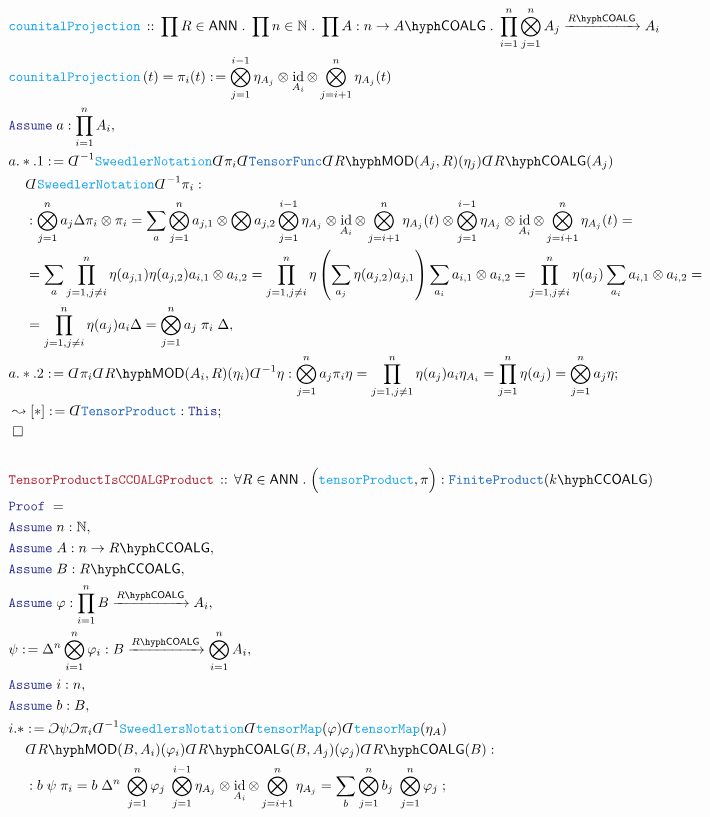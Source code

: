 \documentclass[12pt]{scrartcl}%
\newcommand{\TYPE}[1]{\textcolor{NavyBlue}{\mathtt{#1}}}%
\newcommand{\FUNC}[1]{\textcolor{Cerulean}{\mathtt{#1}}}%
\newcommand{\LOGIC}[1]{\textcolor{Blue}{\mathtt{#1}}}%
\newcommand{\THM}[1]{\textcolor{Maroon}{\mathtt{#1}}}%
\renewcommand{\.}{\; . \;} %
\newcommand{\de}{: \kern 0.1pc =} %
\newcommand{\Act}[1]{\left( #1 \right)} %
\newcommand{\Theorem}[2]{& \THM{#1} \, :: \, #2 \\ & \Proof = \\ } %
\newcommand{\DeclareFunc}[2]{& \FUNC{#1} \, :: \, #2 \\}%
\newcommand{\DefineNamedFunc}[4]{&  \FUNC{#1}\Act{#2} = #3 \de #4 \\}%
\newcommand{\NewLine}{\\ & \kern 1pc}%
\newcommand{\Page}[1]{ \begin{align*} #1 \end{align*}  }%
\newcommand{ \bd }{ \ByDef }%
\newcommand{\Nat}{\mathbb{N}}%
\DeclareMathOperator*{\id}{id}%
\newcommand{\Say}[3]{& #1 \de #2 : #3, \\} %
\newcommand{\Conclude}[3]{& #1 \de #2 : #3; \\}%
\newcommand{\DeriveConclude}[3]{& \leadsto #1 \de #2 : #3 ; \\} %
\newcommand{\Assume}[2]{& \LOGIC{Assume} \; #1 : #2, \\} %
\newcommand{\QED}{\; \square} %
\newcommand{\EndProof}{& \QED \\} %
\newcommand{\ByDef}{\rotatebox[origin=c]{-180}{$D$}}%
\newcommand{\ByConstr}{\rotatebox[origin=c]{-180}{$C$}}%
\newcommand{\Proof}{\LOGIC{Proof} \; } %
\newcommand{\Arrow}[1]{\xrightarrow{#1}}%
\newcommand{\LMOD}[1]{#1\hyph\mathsf{MOD}} %
\newcommand{\ANN}{\mathsf{ANN}} %
\newcommand{\COALG}[1]{#1\hyph\mathsf{COALG}}%
\newcommand{\CCOALG}[1]{#1\hyph\mathsf{CCOALG}}%
\begin{document}
\Page{
	\DeclareFunc{counitalProjection}{
		\prod R \in \ANN \. 
		\prod n \in \Nat \. 
		\prod A : n \to \COALG{A} \. 
		\prod^n_{i=1} \bigotimes^n_{j=1} A_j \Arrow{\COALG{R}} A_i }
	\DefineNamedFunc{counitalProjection}
	{
		t
	}
	{
		\pi_i(t)
	}
	{
		\bigotimes_{j=1}^{i-1} \eta_{A_j} \otimes \id_{A_i} \otimes \bigotimes_{j=i+1}^n \eta_{A_j} (t)
	}
	\Assume{a}{\prod^n_{i=1} A_i}
	\Say{a.*.1}{
		\bd^{-1} \FUNC{SweedlerNotation} \bd \pi_i \bd 
		\TYPE{TensorFunc} 
		\bd \LMOD{R}(A_j,R)(\eta_j)
		\bd \COALG{R}(A_j)
		\NewLine 
		\bd \FUNC{SweedlerNotation} 
		\bd^{-1} \pi_i
	} 
	{
		\NewLine : 
		\bigotimes^n_{j=1} a_j \Delta \pi_i \otimes \pi_i =
		\sum_a \bigotimes^n_{j=1} a_{j,1} \otimes \bigotimes a_{j,2}
		\bigotimes_{j=1}^{i-1} \eta_{A_j} \otimes \id_{A_i} \otimes \bigotimes_{j=i+1}^n \eta_{A_j} (t)
		\otimes
		\bigotimes_{j=1}^{i-1} \eta_{A_j} \otimes \id_{A_i} \otimes \bigotimes_{j=i+1}^n \eta_{A_j} (t) = \NewLine = 
		\sum_a    \prod^n_{j=1,j\neq i} \eta(a_{j,1}) \eta(a_{j,2})  a_{i,1} \otimes a_{i,2} =
		\prod^n_{j=1,j \neq i} \eta\left( \sum_{a_{j}} \eta (a_{j,2})  a_{j,1} \right) \sum_{a_i} a_{i,1} \otimes a_{i,2}  =
		\prod^n_{j=1,j \neq i} \eta(a_j) \sum_{a_i} a_{i,1} \otimes a_{i,2}  = \NewLine = 
		\prod^n_{j=1,j\neq i} \eta(a_j) a_i \Delta = 
		\bigotimes^n_{j=1} a_j \; \pi_i \;  \Delta 
	}
	\Conclude{a.*.2}
	{
		\bd \pi_i \bd \LMOD{R}(A_i,R)(\eta_i)\bd^{-1} \eta
	}
	{
		\bigotimes^n_{j=1} a_j \pi_i \eta = 
		\prod^n_{j=1, j \neq 1} \eta( a_j) a_i \eta_{A_i} = 
		\prod^n_{j=1} \eta(a_j) = 
		\bigotimes^n_{j=1} a_j \eta
	}
	\DeriveConclude{[*]}{\bd \TYPE{TensorProduct}}{\LOGIC{This}}
	\EndProof
	\\
	\Theorem{TensorProductIsCCOALGProduct}
	{ \forall R \in \ANN \. \Big( \FUNC{tensorProduct},\pi\Big) : \TYPE{FiniteProduct}(\CCOALG{k}) }
	\Assume{n}{\Nat}
	\Assume{A}{n \to \CCOALG{R}}
	\Assume{B}{\CCOALG{R}}
	\Assume{\varphi}{\prod^n_{i=1} B \Arrow{\COALG{R}} A_i }                                 
	\Say{\psi}{ \Delta^n \bigotimes^n_{i=1} \varphi_i }{  B \Arrow{\COALG{R}} \bigotimes^n_{i=1} A_i }
	\Assume{i}{n}
	\Assume{b}{B}
	\Conclude{i.*}{
		\ByConstr \psi \ByConstr \pi_i
		\bd^{-1} \FUNC{SweedlersNotation}
		\bd \FUNC{tensorMap}(\varphi)
		\bd \FUNC{tensorMap}(\eta_A) \NewLine  
		\bd \LMOD{R}(B,A_i)(\varphi_i)\bd \COALG{R}(B,A_j)(\varphi_j)
		\bd \COALG{R}(B)
	}
	{ 
	       \NewLine : 
	       b \; \psi \; \pi_i =  
	       b \; \Delta^n \; \bigotimes^n_{j=1}  \varphi_j \; \bigotimes^{i-1}_{j=1} \eta_{A_j} \otimes \id_{A_i} \otimes \bigotimes^n_{j=i+1} \eta_{A_j} = 
	       \sum_b \bigotimes^n_{j=1} b_j \; \bigotimes^n_{j=1} \varphi_j \; 
}}
\end{document}

